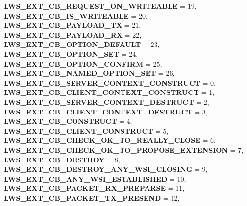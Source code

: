 \begin{DoxyCompactItemize}
\newline
{\bfseries L\+W\+S\+\_\+\+E\+X\+T\+\_\+\+C\+B\+\_\+\+R\+E\+Q\+U\+E\+S\+T\+\_\+\+O\+N\+\_\+\+W\+R\+I\+T\+E\+A\+B\+LE} = 19, 
{\bfseries L\+W\+S\+\_\+\+E\+X\+T\+\_\+\+C\+B\+\_\+\+I\+S\+\_\+\+W\+R\+I\+T\+E\+A\+B\+LE} = 20, 
{\bfseries L\+W\+S\+\_\+\+E\+X\+T\+\_\+\+C\+B\+\_\+\+P\+A\+Y\+L\+O\+A\+D\+\_\+\+TX} = 21, 
{\bfseries L\+W\+S\+\_\+\+E\+X\+T\+\_\+\+C\+B\+\_\+\+P\+A\+Y\+L\+O\+A\+D\+\_\+\+RX} = 22, 
\newline
{\bfseries L\+W\+S\+\_\+\+E\+X\+T\+\_\+\+C\+B\+\_\+\+O\+P\+T\+I\+O\+N\+\_\+\+D\+E\+F\+A\+U\+LT} = 23, 
{\bfseries L\+W\+S\+\_\+\+E\+X\+T\+\_\+\+C\+B\+\_\+\+O\+P\+T\+I\+O\+N\+\_\+\+S\+ET} = 24, 
{\bfseries L\+W\+S\+\_\+\+E\+X\+T\+\_\+\+C\+B\+\_\+\+O\+P\+T\+I\+O\+N\+\_\+\+C\+O\+N\+F\+I\+RM} = 25, 
{\bfseries L\+W\+S\+\_\+\+E\+X\+T\+\_\+\+C\+B\+\_\+\+N\+A\+M\+E\+D\+\_\+\+O\+P\+T\+I\+O\+N\+\_\+\+S\+ET} = 26, 
\newline
{\bfseries L\+W\+S\+\_\+\+E\+X\+T\+\_\+\+C\+B\+\_\+\+S\+E\+R\+V\+E\+R\+\_\+\+C\+O\+N\+T\+E\+X\+T\+\_\+\+C\+O\+N\+S\+T\+R\+U\+CT} = 0, 
{\bfseries L\+W\+S\+\_\+\+E\+X\+T\+\_\+\+C\+B\+\_\+\+C\+L\+I\+E\+N\+T\+\_\+\+C\+O\+N\+T\+E\+X\+T\+\_\+\+C\+O\+N\+S\+T\+R\+U\+CT} = 1, 
{\bfseries L\+W\+S\+\_\+\+E\+X\+T\+\_\+\+C\+B\+\_\+\+S\+E\+R\+V\+E\+R\+\_\+\+C\+O\+N\+T\+E\+X\+T\+\_\+\+D\+E\+S\+T\+R\+U\+CT} = 2, 
{\bfseries L\+W\+S\+\_\+\+E\+X\+T\+\_\+\+C\+B\+\_\+\+C\+L\+I\+E\+N\+T\+\_\+\+C\+O\+N\+T\+E\+X\+T\+\_\+\+D\+E\+S\+T\+R\+U\+CT} = 3, 
\newline
{\bfseries L\+W\+S\+\_\+\+E\+X\+T\+\_\+\+C\+B\+\_\+\+C\+O\+N\+S\+T\+R\+U\+CT} = 4, 
{\bfseries L\+W\+S\+\_\+\+E\+X\+T\+\_\+\+C\+B\+\_\+\+C\+L\+I\+E\+N\+T\+\_\+\+C\+O\+N\+S\+T\+R\+U\+CT} = 5, 
{\bfseries L\+W\+S\+\_\+\+E\+X\+T\+\_\+\+C\+B\+\_\+\+C\+H\+E\+C\+K\+\_\+\+O\+K\+\_\+\+T\+O\+\_\+\+R\+E\+A\+L\+L\+Y\+\_\+\+C\+L\+O\+SE} = 6, 
{\bfseries L\+W\+S\+\_\+\+E\+X\+T\+\_\+\+C\+B\+\_\+\+C\+H\+E\+C\+K\+\_\+\+O\+K\+\_\+\+T\+O\+\_\+\+P\+R\+O\+P\+O\+S\+E\+\_\+\+E\+X\+T\+E\+N\+S\+I\+ON} = 7, 
\newline
{\bfseries L\+W\+S\+\_\+\+E\+X\+T\+\_\+\+C\+B\+\_\+\+D\+E\+S\+T\+R\+OY} = 8, 
{\bfseries L\+W\+S\+\_\+\+E\+X\+T\+\_\+\+C\+B\+\_\+\+D\+E\+S\+T\+R\+O\+Y\+\_\+\+A\+N\+Y\+\_\+\+W\+S\+I\+\_\+\+C\+L\+O\+S\+I\+NG} = 9, 
{\bfseries L\+W\+S\+\_\+\+E\+X\+T\+\_\+\+C\+B\+\_\+\+A\+N\+Y\+\_\+\+W\+S\+I\+\_\+\+E\+S\+T\+A\+B\+L\+I\+S\+H\+ED} = 10, 
{\bfseries L\+W\+S\+\_\+\+E\+X\+T\+\_\+\+C\+B\+\_\+\+P\+A\+C\+K\+E\+T\+\_\+\+R\+X\+\_\+\+P\+R\+E\+P\+A\+R\+SE} = 11, 
\newline
{\bfseries L\+W\+S\+\_\+\+E\+X\+T\+\_\+\+C\+B\+\_\+\+P\+A\+C\+K\+E\+T\+\_\+\+T\+X\+\_\+\+P\+R\+E\+S\+E\+ND} = 12, 

\end{DoxyCompactItemize}
